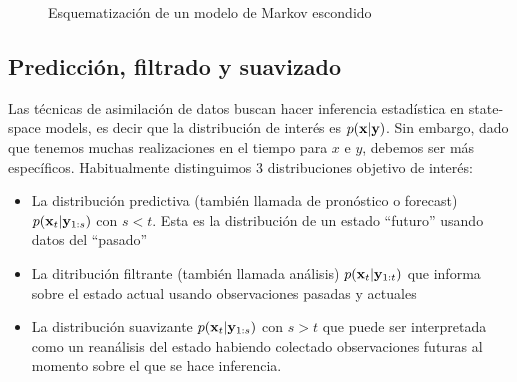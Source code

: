 \begin{figure}
    \centering
    \caption{Esquematización de un modelo de Markov escondido} \label{dia:hmm}
\end{figure}

\subsection{Predicción, filtrado y suavizado}

Las técnicas de asimilación de datos buscan hacer inferencia estadística en state-space models, es decir que la distribución de interés es $p(\mathbf{x} | \mathbf{y})$. Sin embargo, dado que tenemos muchas realizaciones en el tiempo para $x$ e $y$, debemos ser más específicos. Habitualmente distinguimos 3 distribuciones objetivo de interés:
\begin{itemize}
    \item La distribución predictiva (también llamada de pronóstico o forecast) $p(\mathbf{x}_t | \mathbf{y}_{1:s})$ con $s < t$. Esta es la distribución de un estado ``futuro'' usando datos del ``pasado''
    \item La ditribución filtrante (también llamada análisis) $p(\mathbf{x}_t | \mathbf{y}_{1:t})$ que informa sobre el estado actual usando observaciones pasadas y actuales
    \item La distribución suavizante $p(\mathbf{x}_t | \mathbf{y}_{1:s})$ con $s > t$ que puede ser interpretada como un reanálisis del estado habiendo colectado observaciones futuras al momento sobre el que se hace inferencia.
\end{itemize}

